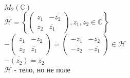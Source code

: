 $ M_2 (\mathbb{C}) $ \\
$ \mathcal{H} =\left\{ \begin{pmatrix}
z_1 & - \overline{z_2} \\
z_2 &  \overline{z_1}
\end{pmatrix}, z_1,z_2 \in \mathbb{C} \right\}$\\
$  -\begin{pmatrix}
z_1 & - \overline{z_2} \\
z_2 &  \overline{z_1}
\end{pmatrix} =  \begin{pmatrix}
-z_1 & -\overline{z_2} \\
-z_2 &  -\overline{z_1}
\end{pmatrix} \in \mathcal{H} $\\
$ -\overline{(z_2)} = \overline{z_2}$ \\
$ \mathcal{H} $ - тело, но не поле \\





